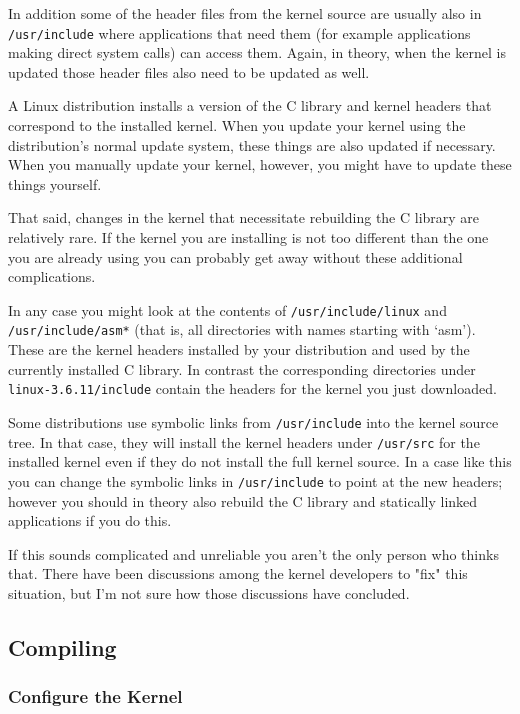 \documentclass{article}
\newcommand{\filename}[1]{\texttt{#1}}   %
\begin{document}
In addition some of the header files from the kernel source are usually also in
\filename{/usr/include} where applications that need them (for example applications making
direct system calls) can access them. Again, in theory, when the kernel is updated those header
files also need to be updated as well.

A Linux distribution installs a version of the C library and kernel headers that correspond to
the installed kernel. When you update your kernel using the distribution's normal update system,
these things are also updated if necessary. When you manually update your kernel, however, you
might have to update these things yourself.

That said, changes in the kernel that necessitate rebuilding the C library are relatively rare.
If the kernel you are installing is not too different than the one you are already using you can
probably get away without these additional complications.

In any case you might look at the contents of \filename{/usr/include/linux} and
\filename{/usr/include/asm*} (that is, all directories with names starting with `asm'). These
are the kernel headers installed by your distribution and used by the currently installed C
library. In contrast the corresponding directories under \filename{linux-3.6.11/include} contain
the headers for the kernel you just downloaded.

Some distributions use symbolic links from \filename{/usr/include} into the kernel source tree.
In that case, they will install the kernel headers under \filename{/usr/src} for the installed
kernel even if they do not install the full kernel source. In a case like this you can change
the symbolic links in \filename{/usr/include} to point at the new headers; however you should in
theory also rebuild the C library and statically linked applications if you do this.

If this sounds complicated and unreliable you aren't the only person who thinks that. There have
been discussions among the kernel developers to "fix" this situation, but I'm not sure how those
discussions have concluded.

\subsection{Compiling}

\subsubsection{Configure the Kernel}
\label{sec:configuring}
\end{document}
